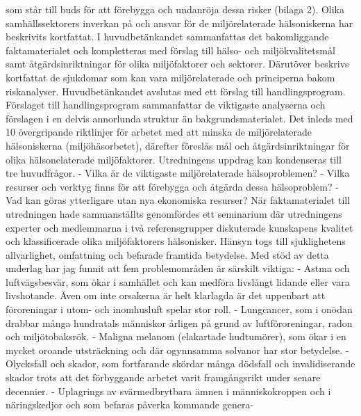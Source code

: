 som står till buds för att förebygga och undanröja dessa risker (bilaga 2). Olika samhällssektorers inverkan på och ansvar för de miljörelaterade hälsoniskerna har beskrivits kortfattat.
I huvudbetänkandet sammanfattas det bakomliggande faktamaterialet och kompletteras med förslag till hälso- och miljökvalitetsmål samt åtgärdsinriktningar för olika miljöfaktorer och sektorer. Därutöver beskrivs kortfattat de sjukdomar som kan vara miljörelaterade och principerna bakom riskanalyser. Huvudbetänkandet avslutas med ett förslag till handlingsprogram.
Förslaget till handlingsprogram sammanfattar de viktigaste analyserna och förslagen i en delvis annorlunda struktur än bakgrundsmaterialet. Det inleds med 10 övergripande riktlinjer för arbetet med att minska de miljörelaterade hälsoniskerna (miljöhäsorbetet), därefter föreslås mål och åtgärdsinriktningar för olika hälsonelaterade miljöfaktorer.
Utredningens uppdrag kan kondenseras till tre huvudfrågor.
- Vilka är de viktigaste miljörelaterade hälsoproblemen?
- Vilka resurser och verktyg finns för att förebygga och åtgärda dessa hälsoproblem?
- Vad kan göras ytterligare utan nya ekonomiska resurser?
När faktamaterialet till utredningen hade sammanställts genomfördes ett seminarium där utredningens experter och medlemmarna i två referensgrupper diskuterade kunskapens kvalitet och klassificerade olika miljöfaktorers hälsonisker. Hänsyn togs till sjuklighetens allvarlighet, omfattning och befarade framtida betydelse. Med stöd av detta underlag har jag funnit att fem problemområden är särskilt viktiga:
- Astma och luftvägsbesvär, som ökar i samhället och kan medföra livslångt lidande eller vara livshotande. Även om inte orsakerna är helt klarlagda är det uppenbart att föroreningar i utom- och inomhusluft spelar stor roll.
- Lungcancer, som i onödan drabbar många hundratals människor årligen på grund av luftföroreningar, radon och miljötobaksrök.
- Maligna melanom (elakartade hudtumörer), som ökar i en mycket oroande utsträckning och där ogynnsamma solvanor har stor betydelse.
- Olycksfall och skador, som fortfarande skördar många dödsfall och invalidiserande skador trots att det förbyggande arbetet varit framgångsrikt under senare decennier.
- Uplagrings av svärmedbrytbara ämnen i människokroppen och i näringskedjor och som befaras påverka kommande genera-

